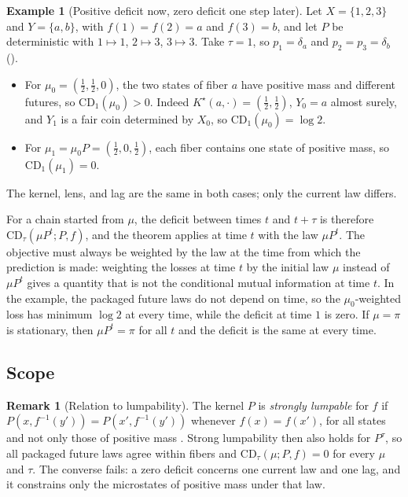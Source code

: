 \documentclass[11pt]{article}
\theoremstyle{definition}
\newtheorem{remark}{Remark}[section]
\newtheorem{example}{Example}[section]
\newcommand{\1}{\mathbf{1}}
\begin{document}
\begin{example}[Positive deficit now, zero deficit one step later]\label{ex:closure_current_law}
Let $X=\{1,2,3\}$ and $Y=\{a,b\}$, with $f(1)=f(2)=a$ and $f(3)=b$, and let $P$ be deterministic with $1\mapsto 1$, $2\mapsto 3$, $3\mapsto 3$.
Take $\tau=1$, so $p_1=\delta_a$ and $p_2=p_3=\delta_b$ ().
\begin{itemize}
  \item For $\mu_0=(\tfrac12,\tfrac12,0)$, the two states of fiber $a$ have positive mass and different futures, so $\mathrm{CD}_1(\mu_0)>0$. Indeed $K^\star(a,\cdot)=(\tfrac12,\tfrac12)$, $Y_0=a$ almost surely, and $Y_1$ is a fair coin determined by $X_0$, so $\mathrm{CD}_1(\mu_0)=\log 2$.
  \item For $\mu_1=\mu_0P=(\tfrac12,0,\tfrac12)$, each fiber contains one state of positive mass, so $\mathrm{CD}_1(\mu_1)=0$.
\end{itemize}
The kernel, lens, and lag are the same in both cases; only the current law differs.
\end{example}

For a chain started from $\mu$, the deficit between times $t$ and $t+\tau$ is therefore $\mathrm{CD}_\tau(\mu P^t;P,f)$, and the theorem applies at time $t$ with the law $\mu P^t$.
The objective must always be weighted by the law at the time from which the prediction is made: weighting the losses at time $t$ by the initial law $\mu$ instead of $\mu P^t$ gives a quantity that is not the conditional mutual information at time $t$.
In the example, the packaged future laws do not depend on time, so the $\mu_0$-weighted loss has minimum $\log 2$ at every time, while the deficit at time $1$ is zero.
If $\mu=\pi$ is stationary, then $\mu P^t=\pi$ for all $t$ and the deficit is the same at every time.

\subsection{Scope}

\begin{remark}[Relation to lumpability]
The kernel $P$ is \emph{strongly lumpable} for $f$ if $P(x,f^{-1}(y'))=P(x',f^{-1}(y'))$ whenever $f(x)=f(x')$, for all states and not only those of positive mass \citep{KemenySnell1960,Buchholz1994}.
Strong lumpability then also holds for $P^\tau$, so all packaged future laws agree within fibers and $\mathrm{CD}_\tau(\mu;P,f)=0$ for every $\mu$ and $\tau$.
The converse fails: a zero deficit concerns one current law and one lag, and it constrains only the microstates of positive mass under that law.
\end{remark}
\end{document}
